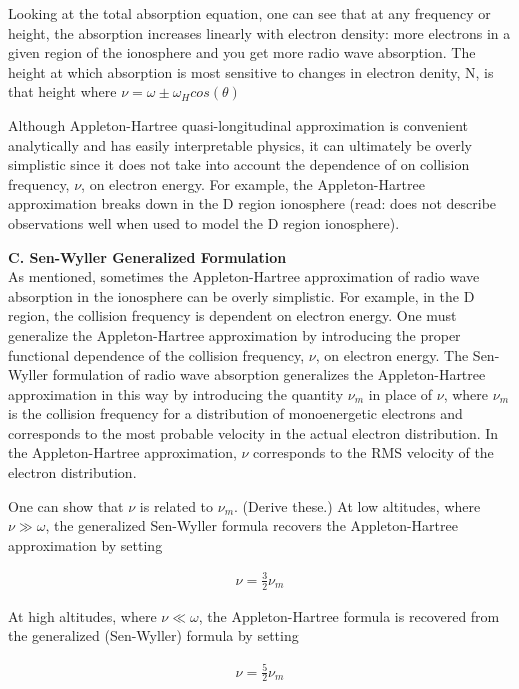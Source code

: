     Looking at the total absorption equation, one can see that at any frequency
    or height, the absorption increases linearly with electron density:
    more electrons in a given region of the ionosphere and you get more
    radio wave absorption. The height at which absorption is most sensitive 
    to changes in electron denity, N, is that height where 
    $\nu=\omega\pm\omega_{H}cos(\theta)$
   
    Although Appleton-Hartree quasi-longitudinal approximation is
    convenient analytically and has easily interpretable physics, it can
    ultimately be overly simplistic since it does not take into account 
    the dependence of on collision frequency, $\nu$, on electron energy.
    For example, the Appleton-Hartree approximation breaks down in the D
    region ionosphere (read: does not describe observations well when
    used to model the D region ionosphere).


  \textbf{C. Sen-Wyller Generalized Formulation} \\  
    As mentioned, sometimes the Appleton-Hartree approximation of radio
    wave absorption in the ionosphere can be overly simplistic. 
    For example, in the D region, the collision frequency is dependent on
    electron energy. One must generalize the Appleton-Hartree
    approximation by introducing the proper functional dependence of
    the collision frequency, $\nu$, on electron energy. 
    The Sen-Wyller formulation of radio wave absorption generalizes the
    Appleton-Hartree approximation in this way by introducing the 
    quantity $\nu_{m}$ in place of $\nu$, where $\nu_{m}$ is the collision
    frequency for a distribution of monoenergetic electrons and
    corresponds to the most probable velocity in the actual electron
    distribution. In the Appleton-Hartree approximation, $\nu$ corresponds to 
    the RMS velocity of the electron distribution. 
    
    One can show that $\nu$ is related to $\nu_{m}$. (Derive these.) At low altitudes, where $\nu\gg\omega$, the generalized Sen-Wyller formula
    recovers the Appleton-Hartree approximation by setting

    \begin{gather*}
      \nu=\frac{3}{2}\nu_{m}
    \end{gather*}

    At high altitudes, where $\nu\ll\omega$, the Appleton-Hartree formula
    is recovered from the generalized (Sen-Wyller) formula by setting

    \begin{gather*}
      \nu=\frac{5}{2}\nu_{m}
    \end{gather*}
    
